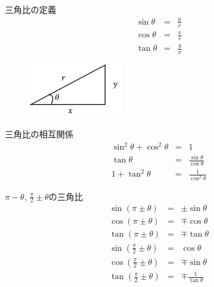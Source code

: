 \documentclass[aspectratio=169, 12pt]{beamer} %
\begin{document}
\begin{frame}{三角比の定義}
    \begin{eqnarray*}
        \sin \theta &=&\frac{y}{r} \\
        \cos \theta &=&\frac{x}{r} \\
        \tan \theta &=&\frac{y}{x}
    \end{eqnarray*}
    \begin{figure}[htbp]
        \begin{center}
            \includegraphics[width=40mm]{fig/4.png}
        \end{center}
    \end{figure}

\end{frame}
\begin{frame}{三角比の相互関係}
    \begin{eqnarray*}
        \sin^2\theta + \cos^2\theta &=&1 \\
        \tan\theta &=& \frac{\sin\theta}{\cos\theta} \\
        1+\tan^2\theta&=&\frac{1}{\cos^2\theta}
    \end{eqnarray*}
\end{frame}
\begin{frame}{$\pi-\theta$, $\frac{\pi}{2}\pm \theta$の三角比}
    \begin{eqnarray*}
        \sin(\pi\pm\theta)&=&\pm\sin\theta \\
        \cos(\pi\pm\theta)&=&\mp\cos\theta \\
        \tan(\pi\pm\theta)&=&\mp\tan\theta \\
        \sin(\frac{\pi}{2}\pm\theta)&=&\cos\theta \\
        \cos(\frac{\pi}{2}\pm\theta)&=&\mp\sin\theta \\
        \tan(\frac{\pi}{2}\pm\theta)&=&\mp\frac{1}{\tan\theta} \\
    \end{eqnarray*}
\end{frame}
\end{document}
